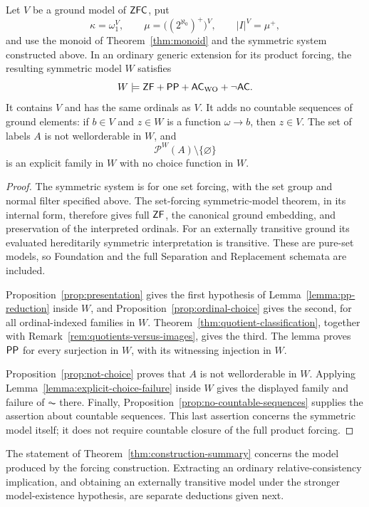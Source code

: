 \begin{theorem}\label{thm:construction-summary}
Let $V$ be a ground model of $\mathsf{ZFC}$, put
\[
 \kappa=\omega_1^V,\qquad
 \mu=\bigl((2^{\aleph_0})^+\bigr)^V,
 \qquad |I|^V=\mu^+,
\]
and use the monoid of Theorem~\ref{thm:monoid} and the symmetric
system constructed above.  In an ordinary generic extension for
its product forcing, the resulting symmetric model $W$ satisfies
\[
 W\models\mathsf{ZF}+\mathsf{PP}+\mathsf{AC}_{\mathrm{WO}}+\neg\mathsf{AC}.
\]
It contains $V$ and has the same ordinals as $V$.  It adds no
countable sequences of ground elements: if $b\in V$ and
$z\in W$ is a function $\omega\longrightarrow b$, then $z\in V$.
The set of labels $A$ is not wellorderable in $W$, and
\[
 \mathcal P^W(A)\setminus\{\varnothing\}
\]
is an explicit family in $W$ with no choice function in $W$.
\end{theorem}

\begin{proof}
The symmetric system is for one set forcing, with the set group and
normal filter specified above.  The set-forcing symmetric-model
theorem, in its internal form, therefore gives full $\mathsf{ZF}$, the
canonical ground embedding, and preservation of the interpreted
ordinals.  For an externally transitive ground its evaluated
hereditarily symmetric interpretation is transitive.  These are
pure-set models, so Foundation and the full Separation and Replacement
schemata are included.

Proposition~\ref{prop:presentation} gives the first hypothesis of
Lemma~\ref{lemma:pp-reduction} inside $W$, and
Proposition~\ref{prop:ordinal-choice} gives the second, for all
ordinal-indexed families in $W$.  Theorem~\ref{thm:quotient-classification},
together with Remark~\ref{rem:quotients-versus-images}, gives the third.
The lemma proves $\mathsf{PP}$ for every surjection in $W$, with its witnessing
injection in $W$.

Proposition~\ref{prop:not-choice} proves that $A$ is not wellorderable
in $W$.  Applying Lemma~\ref{lemma:explicit-choice-failure} inside
$W$ gives the displayed family and failure of $\AC$ there.
Finally, Proposition~\ref{prop:no-countable-sequences} supplies the
assertion about countable sequences.  This last assertion concerns
the symmetric model itself; it does not require countable closure
of the full product forcing.
\end{proof}

The statement of Theorem~\ref{thm:construction-summary} concerns the
model produced by the forcing construction.  Extracting an ordinary
relative-consistency implication, and obtaining an externally
transitive model under the stronger model-existence hypothesis,
are separate deductions given next.
